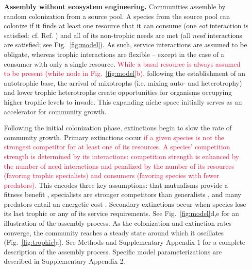 \documentclass[twocolumn,preprintnumbers,amsmath,amssymb,superscriptaddress,linenumbers]{revtex4-1}
\newcommand{\rev}[1]{\textcolor{crimson}{#1}}
\begin{document}
\vspace{0mm}
\noindent \textbf{Assembly without ecosystem engineering.}
\noindent Communities assemble by random colonization from a source pool.
A species from the source pool can colonize if it finds at least one resource that it can consume (one \emph{eat} interaction is satisfied; cf. Ref. ) and all of its non-trophic needs are met (all \emph{need} interactions are satisfied; see Fig.\ \ref{fig:model}).
As such, service interactions are assumed to be obligate, whereas trophic interactions are flexible -- except in the case of a consumer with only a single resource.
\rev{While a basal resource is always assumed to be present (white node in Fig.\ \ref{fig:model}b)}, following the establishment of an autotrophic base, the arrival of mixotrophs (i.e. mixing auto- and heterotrophy) and lower trophic heterotrophs create opportunities for organisms occupying higher trophic levels to invade.
This expanding niche space initially serves as an accelerator for community growth.

Following the initial colonization phase, extinctions begin to slow the rate of community growth.
Primary extinctions occur \rev{if a given species is not the strongest competitor for at least one of its resources}.
\rev{A species' competition strength is determined by its interactions: competition strength is enhanced by the number of need interactions and penalized by the number of its resources (favoring trophic specialists) and consumers (favoring species with fewer predators).}
This encodes three key assumptions: that mutualisms provide a fitness benefit \cite{Bronstein1994}, specialists are stronger competitors than generalists \cite{Macarthur1964,Dykhuizen1980,Futuyma1988,Costa2015}, and many predators entail an energetic cost \cite{Brown1994}.
Secondary extinctions occur when species lose its last trophic or any of its service requirements.
See Fig.\ \ref{fig:model}d,e for an illustration of the assembly process. 
As the colonization and extinction rates converge, the community reaches a steady state around which it oscillates (Fig.\ \ref{fig:trophic}a).
See Methods and Supplementary Appendix 1 for a complete description of the assembly process.
Specific model parameterizations are described in Supplementary Appendix 2. %
\end{document}
